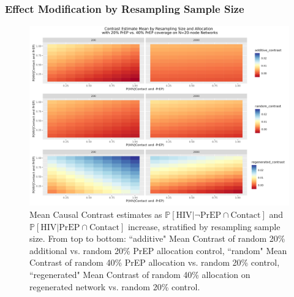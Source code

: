 \documentclass{article}
\theoremstyle{definition}
\begin{document}
\subsubsection{Effect Modification by Resampling Sample Size}
\begin{figure}[H]
    \centering
    \includegraphics[width=\linewidth]{Corrected Figures/Resampling Size Mean Plot.png}
    \caption{Mean Causal Contrast estimates as $\mathbb{P}\left[\text{HIV} \vert \neg \text{PrEP} \cap \text{Contact}\right]$ and $\mathbb{P}\left[\text{HIV} \vert \text{PrEP} \cap \text{Contact}\right]$ increase, stratified by resampling sample size. From top to bottom: ``additive" Mean Contrast of random 20\% additional vs. random 20\% PrEP allocation control, ``random" Mean Contrast of random 40\% PrEP allocation vs. random 20\% control, ``regenerated" Mean Contrast of random 40\% allocation on regenerated network vs. random 20\% control.}
    \label{fig:Figure S4.3}
\end{figure}
\end{document}
